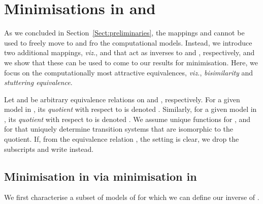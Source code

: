 \documentclass{llncs}
\newcommand{\viz}{\emph{viz.}}
\begin{document}
\section{Minimisations in \LTS and \KS}
\label{sec:minimisations}

As we concluded in Section~\ref{Sect:preliminaries}, the mappings 
and  cannot be used to freely move to and fro the computational
models.  Instead, we introduce two additional mappings, \viz, 
and  that act as inverses to  and , respectively, and
we show that these can be used to come to our results for minimisation.
Here, we focus on the computationally most attractive
equivalences, \viz, \emph{bisimilarity} and \emph{stuttering equivalence}.

\renewcommand{\min}[1]{{#1}\textrm{-min}}
\newcommand{\minKS}[1]{{#1}\textrm{-min}_{\KS}}
\newcommand{\minLTS}[1]{{#1}\textrm{-min}_{\LTS}}
\newcommand{\quotient}[2]{\ensuremath{{#1}_{/#2}}}
Let  and  be arbitrary equivalence
relations on \KS and \LTS, respectively.  For a given model  in \KS, its \emph{quotient}
with respect to  is denoted . Similarly, for a given model  in \LTS, its \emph{quotient}
with respect to  is denoted . We assume
unique functions  for \KS, and 
for \LTS that uniquely determine transition systems that are isomorphic
to the quotient. If, from the equivalence relation , the setting
is clear, we drop the subscripts and write  instead.

\subsection{Minimisation in \KS via minimisation in \LTS}


We first characterise a subset of models of \LTS for which we can
define our inverse  of .
\end{document}
